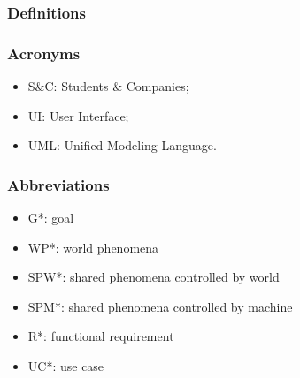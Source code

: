 \renewcommand{\arraystretch}{1.5}
\subsubsection{Definitions}
\subsubsection{Acronyms}
\begin{itemize}
    \item S\&C: Students \& Companies;
    \item UI: User Interface;
    \item UML: Unified Modeling Language.
\end{itemize}
\subsubsection{Abbreviations}
\begin{itemize}
    \item G*: goal
    \item WP*: world phenomena
    \item SPW*: shared phenomena controlled by world
    \item SPM*: shared phenomena controlled by machine
    \item R*: functional requirement
    \item UC*: use case
\end{itemize}